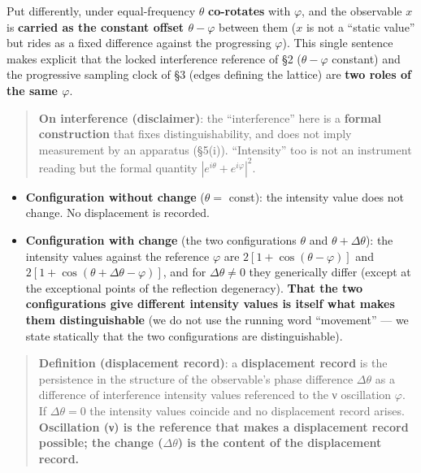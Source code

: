 \documentclass[
]{ltjsarticle}
\providecommand{\tightlist}{%
  \setlength{\itemsep}{0pt}\setlength{\parskip}{0pt}}
\begin{document}
Put differently, under equal-frequency \(\theta\) \textbf{co-rotates}
with \(\varphi\), and the observable \(x\) is \textbf{carried as the
constant offset \(\theta-\varphi\)} between them (\(x\) is not a
``static value'' but rides as a fixed difference against the progressing
\(\varphi\)). This single sentence makes explicit that the locked
interference reference of §2 (\(\theta-\varphi\) constant) and the
progressive sampling clock of §3 (edges defining the lattice) are
\textbf{two roles of the same \(\varphi\)}.

\begin{quote}
\textbf{On interference (disclaimer)}: the ``interference'' here is a
\textbf{formal construction} that fixes distinguishability, and does not
imply measurement by an apparatus (§5(i)). ``Intensity'' too is not an
instrument reading but the formal quantity
\(|e^{i\theta}+e^{i\varphi}|^2\).
\end{quote}

\begin{itemize}
\tightlist
\item
  \textbf{Configuration without change} (\(\theta=\) const): the
  intensity value does not change. No displacement is recorded.
\item
  \textbf{Configuration with change} (the two configurations \(\theta\)
  and \(\theta+\Delta\theta\)): the intensity values against the
  reference \(\varphi\) are \(2[1+\cos(\theta-\varphi)]\) and
  \(2[1+\cos(\theta+\Delta\theta-\varphi)]\), and for
  \(\Delta\theta\neq0\) they generically differ (except at the
  exceptional points of the reflection degeneracy). \textbf{That the two
  configurations give different intensity values is itself what makes
  them distinguishable} (we do not use the running word ``movement'' ---
  we state statically that the two configurations are distinguishable).
\end{itemize}

\begin{quote}
\textbf{Definition (displacement record)}: a \textbf{displacement
record} is the persistence in the structure of the observable's phase
difference \(\Delta\theta\) as a difference of interference intensity
values referenced to the ν oscillation \(\varphi\). If
\(\Delta\theta=0\) the intensity values coincide and no displacement
record arises. \textbf{Oscillation (ν) is the reference that makes a
displacement record possible; the change (\(\Delta\theta\)) is the
content of the displacement record.}
\end{quote}
\end{document}
